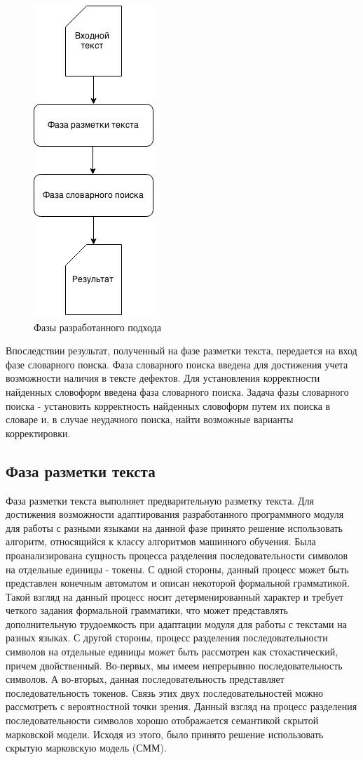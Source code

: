 \begin{figure}[H]
	\centering
	\includegraphics[scale=0.7]{img/approach.png}
	\caption{Фазы разработанного подхода}
\end{figure}
Впоследствии результат, полученный на фазе разметки текста, передается на вход фазе словарного поиска. Фаза словарного поиска введена для достижения учета возможности наличия в тексте дефектов. Для установления корректности найденных словоформ введена фаза словарного поиска. Задача фазы словарного поиска - установить корректность найденных словоформ путем их поиска в словаре и, в случае неудачного поиска, найти возможные варианты корректировки.

\subsection{Фаза разметки текста}
Фаза разметки текста выполняет предварительную разметку текста. Для достижения возможности адаптирования разработанного программного модуля для работы с разными языками на данной фазе принято решение использовать алгоритм, относящийся к классу алгоритмов машинного обучения. Была проанализирована сущность процесса разделения последовательности символов на отдельные единицы - токены. С одной стороны, данный процесс может быть представлен конечным автоматом и описан некоторой формальной грамматикой. Такой взгляд на данный процесс носит детерменированный характер и требует четкого задания формальной грамматики, что может представлять дополнительную трудоемкость при адаптации модуля для работы с текстами на разных языках. С другой стороны, процесс разделения последовательности символов на отдельные единицы может быть рассмотрен как стохастический, причем двойственный. Во-первых, мы имеем непрерывню последовательность символов. А во-вторых, данная последовательность представляет последовательность токенов. Связь этих двух последовательностей можно рассмотреть с вероятностной точки зрения. Данный взгляд на процесс разделения последовательности символов хорошо отображается семантикой скрытой марковской модели. Исходя из этого, было принято решение использовать скрытую марковскую модель (СММ). 


